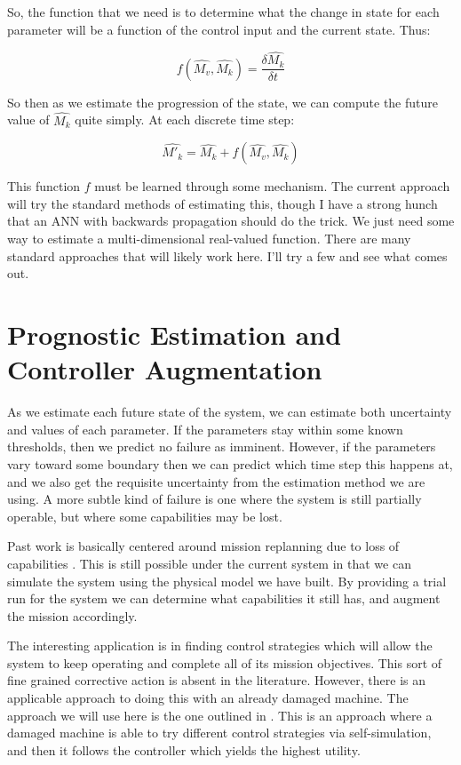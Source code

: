 \documentclass[12pt]{article}
\begin{document}
So, the function that we need is to determine what the change in state
for each parameter will be a function of the control input and the
current state.  Thus:

\[
f(\hat{M_v}, \hat{M_k}) = \dfrac{\delta \hat{M_k}}{\delta t}
\]

So then as we estimate the progression of the state, we can compute
the future value of $\hat{M_k}$ quite simply.  At each discrete
time step:

\[
\hat{M'_k} = \hat{M_k} + f(\hat{M_v}, \hat{M_k})
\]

This function $f$ must be learned through some mechanism.  The current
approach will try the standard methods of estimating this, though I
have a strong hunch that an ANN with backwards propagation should do
the trick.  We just need some way to estimate a multi-dimensional
real-valued function.  There are many standard approaches that will
likely work here.  I'll try a few and see what comes out.

\section{Prognostic Estimation and Controller Augmentation}
As we estimate each future state of the system, we can estimate both
uncertainty and values of each parameter.  If the parameters stay
within some known thresholds, then we predict no failure as imminent.
However, if the parameters vary toward some boundary then we can
predict which time step this happens at, and we also get the requisite
uncertainty from the estimation method we are using.  A more subtle
kind of failure is one where the system is still partially operable,
but where some capabilities may be lost.

Past work is basically centered around
mission replanning due to loss of capabilities \cite{balaban}.  This is still
possible under the current system in that we can simulate the system
using the physical model we have built.  By providing a trial run for
the system we can determine what capabilities it still has, and
augment the mission accordingly.  

The interesting application is in finding control strategies which
will allow the system to keep operating and complete all of its
mission objectives.  This sort of fine grained corrective action is
absent in the literature.  However, there is an applicable approach to
doing this with an already damaged machine.  The approach we will use
here is the one outlined in \cite{koos}.  This is an approach where a
damaged machine is able to try different control strategies via
self-simulation, and then it follows the controller which yields the
highest utility.
\end{document}
